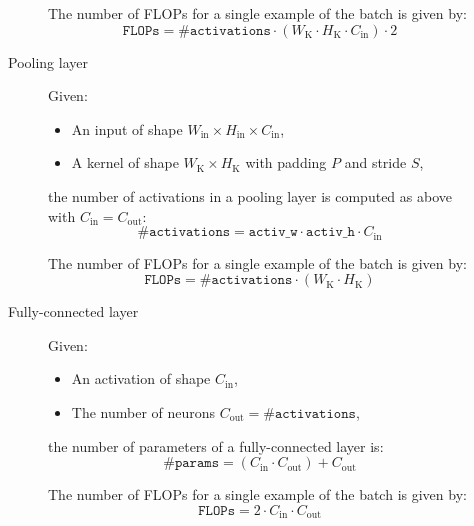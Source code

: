 \begin{description}
\begin{description}
                The number of FLOPs for a single example of the batch is given by:
                \[ \texttt{FLOPs} = \texttt{\#activations} \cdot (W_\text{K} \cdot H_\text{K} \cdot C_\text{in}) \cdot 2 \]

            \item[Pooling layer]
                Given:
                \begin{itemize}
                    \item An input of shape $W_\text{in} \times H_\text{in} \times C_\text{in}$,
                    \item A kernel of shape $W_\text{K} \times H_\text{K}$ with padding $P$ and stride $S$,
                \end{itemize}
                the number of activations in a pooling layer is computed as above with $C_\text{in} = C_\text{out}$:
                \[ \texttt{\#activations} = \texttt{activ\_w} \cdot \texttt{activ\_h} \cdot C_\text{in} \]

                The number of FLOPs for a single example of the batch is given by:
                \[ \texttt{FLOPs} = \texttt{\#activations} \cdot (W_\text{K} \cdot H_\text{K}) \]

            \item[Fully-connected layer]
                Given:
                \begin{itemize}
                    \item An activation of shape $C_\text{in}$,
                    \item The number of neurons $C_\text{out} = \texttt{\#activations}$,
                \end{itemize}
                the number of parameters of a fully-connected layer is:
                \[ \texttt{\#params} = (C_\text{in} \cdot C_\text{out}) + C_\text{out}\]

                The number of FLOPs for a single example of the batch is given by:
                \[ \texttt{FLOPs} = 2 \cdot C_\text{in} \cdot C_\text{out} \]


\end{description}
\end{description}
